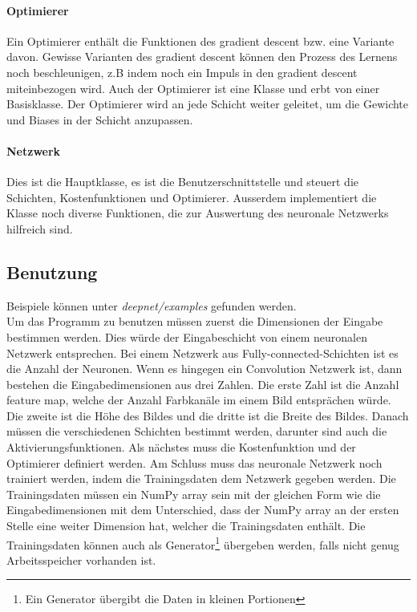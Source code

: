 \documentclass[12pt,a4paper]{report}
\begin{document}
\paragraph{Optimierer}
Ein Optimierer enthält die Funktionen des gradient descent bzw. eine Variante davon.
Gewisse Varianten des gradient descent können den Prozess des Lernens noch beschleunigen,
z.B indem noch ein Impuls in den gradient descent miteinbezogen wird\cite{optimization}.
Auch der Optimierer ist eine Klasse und erbt von einer Basisklasse.
Der Optimierer wird an jede Schicht weiter geleitet, um die Gewichte und Biases in der Schicht anzupassen.
\paragraph{Netzwerk}
Dies ist die Hauptklasse, es ist die Benutzerschnittstelle und
steuert die Schichten, Kostenfunktionen und Optimierer.
Ausserdem implementiert die Klasse noch diverse Funktionen, die zur Auswertung des neuronale Netzwerks hilfreich sind.

\subsection{Benutzung}
Beispiele können unter \textit{deepnet/examples} gefunden werden.\bigskip\\
Um das Programm zu benutzen müssen zuerst die Dimensionen der Eingabe bestimmen werden.
Dies würde der Eingabeschicht von einem neuronalen Netzwerk entsprechen.
Bei einem Netzwerk aus Fully-connected-Schichten ist es die Anzahl der Neuronen.
Wenn es hingegen ein Convolution Netzwerk ist, dann bestehen die Eingabedimensionen aus drei Zahlen.
Die erste Zahl ist die Anzahl feature map, welche der Anzahl Farbkanäle im einem Bild entsprächen würde.
Die zweite ist die Höhe des Bildes und die dritte ist die Breite des Bildes.
Danach müssen die verschiedenen Schichten bestimmt werden, darunter sind auch die Aktivierungsfunktionen.
Als nächstes muss die Kostenfunktion und der Optimierer definiert werden.
Am Schluss muss das neuronale Netzwerk noch trainiert werden, indem die Trainingsdaten dem Netzwerk gegeben werden.
Die Trainingsdaten müssen ein NumPy array sein mit der gleichen Form wie die Eingabedimensionen mit dem Unterschied,
dass der NumPy array an der ersten Stelle eine weiter Dimension hat, welcher die Trainingsdaten enthält.
Die Trainingsdaten können auch als Generator\footnote{Ein Generator übergibt die Daten in kleinen Portionen} übergeben werden,
falls nicht genug Arbeitsspeicher vorhanden ist.
\end{document}
